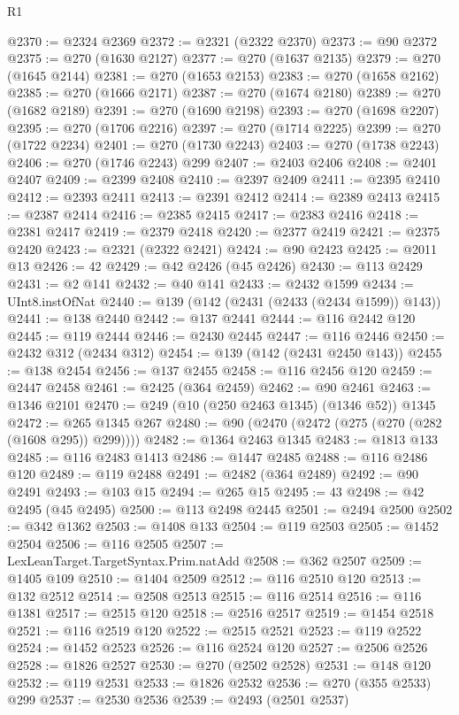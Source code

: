 \begin{lexlean}{R1}
\begin{coremodule}
@2370 := @2324 @2369
@2372 := @2321 (@2322 @2370)
@2373 := @90 @2372
@2375 := @270 (@1630 @2127)
@2377 := @270 (@1637 @2135)
@2379 := @270 (@1645 @2144)
@2381 := @270 (@1653 @2153)
@2383 := @270 (@1658 @2162)
@2385 := @270 (@1666 @2171)
@2387 := @270 (@1674 @2180)
@2389 := @270 (@1682 @2189)
@2391 := @270 (@1690 @2198)
@2393 := @270 (@1698 @2207)
@2395 := @270 (@1706 @2216)
@2397 := @270 (@1714 @2225)
@2399 := @270 (@1722 @2234)
@2401 := @270 (@1730 @2243)
@2403 := @270 (@1738 @2243)
@2406 := @270 (@1746 @2243) @299
@2407 := @2403 @2406
@2408 := @2401 @2407
@2409 := @2399 @2408
@2410 := @2397 @2409
@2411 := @2395 @2410
@2412 := @2393 @2411
@2413 := @2391 @2412
@2414 := @2389 @2413
@2415 := @2387 @2414
@2416 := @2385 @2415
@2417 := @2383 @2416
@2418 := @2381 @2417
@2419 := @2379 @2418
@2420 := @2377 @2419
@2421 := @2375 @2420
@2423 := @2321 (@2322 @2421)
@2424 := @90 @2423
@2425 := @2011 @13
@2426 := 42
@2429 := @42 @2426 (@45 @2426)
@2430 := @113 @2429
@2431 := @2 @141
@2432 := @40 @141
@2433 := @2432 @1599
@2434 := UInt8.instOfNat
@2440 := @139 (@142 (@2431 (@2433 (@2434 @1599)) @143))
@2441 := @138 @2440
@2442 := @137 @2441
@2444 := @116 @2442 @120
@2445 := @119 @2444
@2446 := @2430 @2445
@2447 := @116 @2446
@2450 := @2432 @312 (@2434 @312)
@2454 := @139 (@142 (@2431 @2450 @143))
@2455 := @138 @2454
@2456 := @137 @2455
@2458 := @116 @2456 @120
@2459 := @2447 @2458
@2461 := @2425 (@364 @2459)
@2462 := @90 @2461
@2463 := @1346 @2101
@2470 := @249 (@10 (@250 @2463 @1345) (@1346 @52)) @1345
@2472 := @265 @1345 @267
@2480 := @90 (@2470 (@2472 (@275 (@270 (@282 (@1608 @295)) @299))))
@2482 := @1364 @2463 @1345
@2483 := @1813 @133
@2485 := @116 @2483 @1413
@2486 := @1447 @2485
@2488 := @116 @2486 @120
@2489 := @119 @2488
@2491 := @2482 (@364 @2489)
@2492 := @90 @2491
@2493 := @103 @15
@2494 := @265 @15
@2495 := 43
@2498 := @42 @2495 (@45 @2495)
@2500 := @113 @2498 @2445
@2501 := @2494 @2500
@2502 := @342 @1362
@2503 := @1408 @133
@2504 := @119 @2503
@2505 := @1452 @2504
@2506 := @116 @2505
@2507 := LexLeanTarget.TargetSyntax.Prim.natAdd
@2508 := @362 @2507
@2509 := @1405 @109
@2510 := @1404 @2509
@2512 := @116 @2510 @120
@2513 := @132 @2512
@2514 := @2508 @2513
@2515 := @116 @2514
@2516 := @116 @1381
@2517 := @2515 @120
@2518 := @2516 @2517
@2519 := @1454 @2518
@2521 := @116 @2519 @120
@2522 := @2515 @2521
@2523 := @119 @2522
@2524 := @1452 @2523
@2526 := @116 @2524 @120
@2527 := @2506 @2526
@2528 := @1826 @2527
@2530 := @270 (@2502 @2528)
@2531 := @148 @120
@2532 := @119 @2531
@2533 := @1826 @2532
@2536 := @270 (@355 @2533) @299
@2537 := @2530 @2536
@2539 := @2493 (@2501 @2537)

\end{coremodule}
\end{lexlean}
